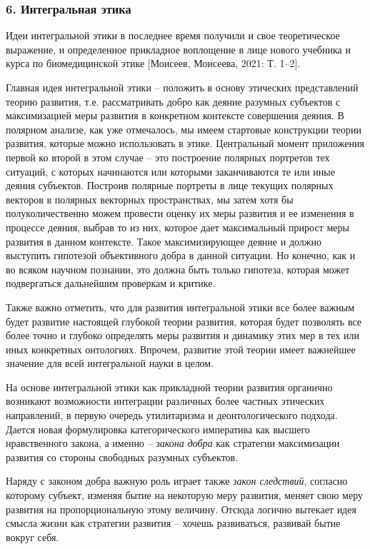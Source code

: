     \subsubsection*{6. Интегральная этика}
    Идеи интегральной этики в последнее время получили и свое теоретическое выражение, и определенное прикладное воплощение в лице нового учебника и курса по биомедицинской этике [Моисеев, Моисеева, 2021: Т. 1–2].

    Главная идея интегральной этики – положить в основу этических представлений теорию развития, т.е. рассматривать добро как деяние разумных субъектов с максимизацией меры развития в конкретном контексте совершения деяния. В полярном анализе, как уже отмечалось, мы имеем стартовые конструкции теории развития, которые можно использовать в этике. Центральный момент приложения первой ко второй в этом случае – это построение полярных портретов тех ситуаций, с которых начинаются или которыми заканчиваются те или иные деяния субъектов. Построив полярные портреты в лице текущих полярных векторов в полярных векторных пространствах, мы затем хотя бы полуколичественно можем провести оценку их меры развития и ее изменения в процессе деяния, выбрав то из них, которое дает максимальный прирост меры развития в данном контексте. Такое максимизирующее деяние и должно выступить гипотезой объективного добра в данной ситуации. Но конечно, как и во всяком научном познании, это должна быть только гипотеза, которая может подвергаться дальнейшим проверкам и критике.

    Также важно отметить, что для развития интегральной этики все более важным будет развитие настоящей глубокой теории развития, которая будет позволять все более точно и глубоко определять меры развития и динамику этих мер в тех или иных конкретных онтологиях. Впрочем, развитие этой теории имеет важнейшее значение для всей интегральной науки в целом.

    На основе интегральной этики как прикладной теории развития органично возникают возможности интеграции различных более частных этических направлений, в первую очередь утилитаризма и деонтологического подхода. Дается новая формулировка категорического императива как высшего нравственного закона, а именно – \textit{закона добра} как стратегии максимизации развития со стороны свободных разумных субъектов.

    Наряду с законом добра важную роль играет также \textit{закон следствий}, согласно которому субъект, изменяя бытие на некоторую меру развития, меняет свою меру развития на пропорциональную этому величину. Отсюда логично вытекает идея смысла жизни как стратегии развития – хочешь развиваться, развивай бытие вокруг себя.


